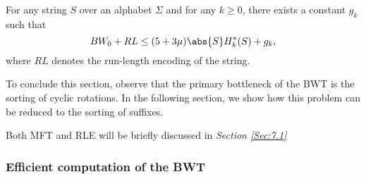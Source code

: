 \documentclass{subfiles}
\begin{document}
        \begin{theorem*}
            For any string \(S\) over an alphabet \(\Sigma\) and for any \(k \ge 0\), 
            there exists a constant \(g_{k}\) such that
            \[
                BW_{0} + RL \le (5 + 3\mu)\abs{S} H_{k}^{*}(S) + g_{k},
            \]
            where \(RL\) denotes the run-length encoding of the string.
        \end{theorem*}

    To conclude this section, observe that the primary bottleneck of the BWT 
        is the sorting of cyclic rotations. In the following section, we show how 
        this problem can be reduced to the sorting of suffixes.

    \begin{remark*}
        Both MFT and RLE will be briefly discussed in \emph{Section \ref{Sec:7.1}}
    \end{remark*}

    \subsubsection{Efficient computation of the BWT}
    
\end{document}
